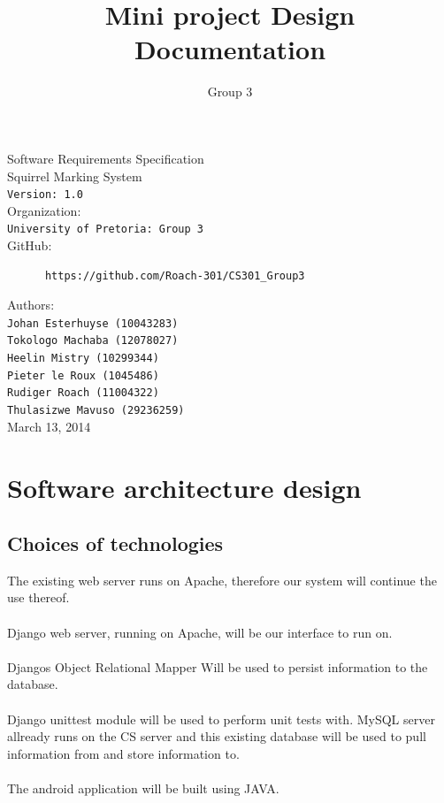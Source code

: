 \documentclass[12pt,a4paper]{article}
\author{Group 3}
\title{Mini project Design Documentation}
\begin{document}
\begin{titlepage}
\begin{center}

\huge Software Requirements Specification\\[0.15cm]
\huge Squirrel Marking System\\[0.15cm]
\large \texttt{Version: 1.0}\\[1cm]

Organization:\\
\texttt{University of Pretoria: Group 3}\\[0.5cm]
GitHub:\\[0.01cm]
\begin{verbatim}
      https://github.com/Roach-301/CS301_Group3
\end{verbatim}

Authors:\\
\texttt{Johan Esterhuyse (10043283)\\
        Tokologo Machaba (12078027)\\
        Heelin Mistry (10299344)\\
        Pieter le Roux (1045486)\\
        Rudiger Roach (11004322)\\
        Thulasizwe Mavuso (29236259)}\\[1cm]
        
March 13, 2014
\end{center}
\end{titlepage}
\tableofcontents
\pagebreak
\section{Software architecture design}
\subsection{Choices of technologies}

The existing web server runs on Apache, therefore our system will continue the use thereof.\\\\
Django web server, running on Apache, will be our interface to run on.\\\\
Djangos Object Relational Mapper Will be used to persist information to the database.\\\\
Django unittest module will be used to perform unit tests with.
MySQL server allready runs on the CS server and this existing database will be used to pull information from and store information to.\\\\
The android application will be built using JAVA.
\end{document}
